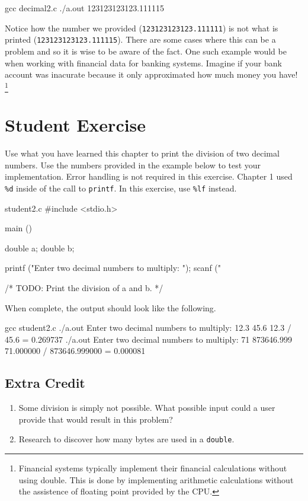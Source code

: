 \begin{Terminal}
gcc decimal2.c
./a.out
123123123123.111115
\end{Terminal}

Notice how the number we provided (\verb|123123123123.111111|) is not what is
printed (\verb|123123123123.111115|).  There are some cases where this can be a
problem and so it is wise to be aware of the fact.  One such example would be
when working with financial data for banking systems.  Imagine if your bank
account was inacurate because it only approximated how much money you have!
\footnote{Financial systems typically implement their financial calculations
without using double. This is done by implementing arithmetic calculations
without the assistence of floating point provided by the CPU.}


\section{Student Exercise}

Use what you have learned this chapter to print the division of two decimal
numbers. Use the numbers provided in the example below to test your
implementation. Error handling is not required in this exercise. Chapter 1 used
\verb|%d| inside of the call to \verb|printf|. In this exercise, use \verb|%lf|
instead.

\begin{code}{student2.c}
#include <stdio.h>

main ()
{
    double a;
    double b;

    printf ("Enter two decimal numbers to multiply: ");
    scanf ("%

    /* TODO: Print the division of a and b. */
}
\end{code}

When complete, the output should look like the following.

\begin{Terminal}
gcc student2.c
./a.out
Enter two decimal numbers to multiply: 12.3 45.6
12.3 / 45.6 = 0.269737
./a.out
Enter two decimal numbers to multiply: 71 873646.999
71.000000 / 873646.999000 = 0.000081
\end{Terminal}

\subsection{Extra Credit}

\begin{enumerate}
\item Some division is simply not possible. What possible input could a user provide
that would result in this problem?
\item Research to discover how many bytes are used in a \verb|double|.
\end{enumerate}
